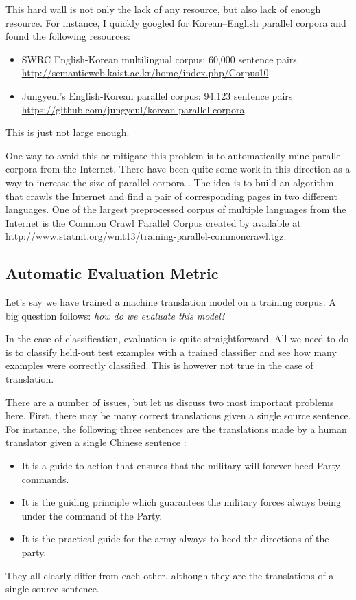 \documentclass{report}
\begin{document}
This hard wall is not only the lack of any resource, but also lack of enough
resource. For instance, I quickly googled for Korean--English parallel corpora
and found the following resources:
\begin{itemize}
    \item SWRC English-Korean multilingual corpus: 60,000 sentence pairs
        \url{http://semanticweb.kaist.ac.kr/home/index.php/Corpus10}
    \item Jungyeul's English-Korean parallel corpus: 94,123 sentence pairs
        \url{https://github.com/jungyeul/korean-parallel-corpora}
\end{itemize}
This is just not large enough. 

One way to avoid this or mitigate this problem is to automatically mine parallel
corpora from the Internet. There have been quite some work in this direction as
a way to increase the size of parallel corpora
\citep{resnik2003web,zhang2006automatic}. The idea is to build an algorithm that
crawls the Internet and find a pair of corresponding pages in two different
languages. One of the largest preprocessed corpus of multiple languages from the
Internet is the Common Crawl Parallel Corpus created by \citet{smith2013dirt} available at
\url{http://www.statmt.org/wmt13/training-parallel-commoncrawl.tgz}.




\subsection{Automatic Evaluation Metric}
\label{sec:bleu}

Let's say we have trained a machine translation model on a training corpus. A
big question follows: {\em how do we evaluate this model}?

In the case of classification, evaluation is quite straightforward. All we need
to do is to classify held-out test examples with a trained classifier and see
how many examples were correctly classified. This is however not true in the
case of translation. 

There are a number of issues, but let us discuss two most important problems
here. First, there may be many correct translations given a single source
sentence. For instance, the following three sentences are the translations made
by a human translator given a single Chinese sentence \citep{papineni2002bleu}:
\begin{itemize}
    \itemsep 0em
    \item It is a guide to action that ensures that the military will forever
        heed Party commands.
    \item It is the guiding principle which guarantees the military forces
        always being under the command of the Party.
    \item It is the practical guide for the army always to heed the directions
        of the party.
\end{itemize}
They all clearly differ from each other, although they are the translations of a
single source sentence. 
\end{document}
